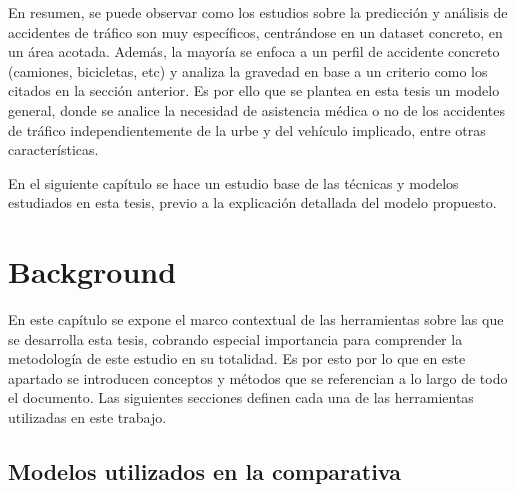 \documentclass{uathesis-es}
\begin{document}



En resumen, se puede observar como los estudios sobre la predicción y análisis de accidentes de tráfico son muy específicos, centrándose en un dataset concreto, en un área acotada. Además, la mayoría se enfoca a un perfil de accidente concreto (camiones, bicicletas, etc) y analiza la gravedad en base a un criterio como los citados en la sección anterior. Es por ello que se plantea en esta tesis un modelo general, donde se analice la necesidad de asistencia médica o no de los accidentes de tráfico independientemente de la urbe y del vehículo implicado, entre otras características.

En el siguiente capítulo se hace un estudio base de las técnicas y modelos estudiados en esta tesis, previo a la explicación detallada del modelo propuesto.

\chapter{Background}

En este capítulo se expone el marco contextual de las herramientas sobre las que se desarrolla esta tesis, cobrando especial importancia para comprender la metodología de este estudio en su totalidad. Es por esto por lo que en este apartado se introducen conceptos y métodos que se referencian a lo largo de todo el documento. Las siguientes secciones definen cada una de las herramientas utilizadas en este trabajo.


\section{Modelos utilizados en la comparativa}

\end{document}
